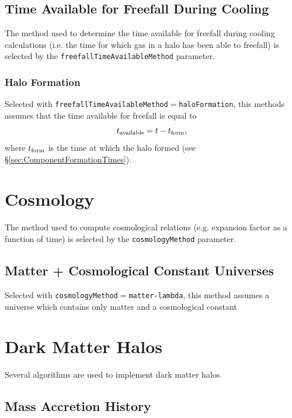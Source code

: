 \subsection{Time Available for Freefall During Cooling}\label{sec:TimeAvailableFreefall}

The method used to determine the time available for freefall during cooling calculations (i.e. the time for which gas in a halo has been able to freefall) is selected by the {\tt freefallTimeAvailableMethod} parameter.

\subsubsection{Halo Formation}

Selected with {\tt freefallTimeAvailableMethod}$=${\tt haloFormation}, this methods assumes that the time available for freefall is equal to
\begin{equation}
 t_{\rm available} = t - t_{\rm form},
\end{equation}
where $t_{\rm form}$ is the time at which the halo formed (see \S\ref{sec:ComponentFormationTimes}).

\section{Cosmology}

The method used to compute cosmological relations (e.g. expansion factor as a function of time) is selected by the {\tt cosmologyMethod} parameter.

\subsection{Matter + Cosmological Constant Universes}

Selected with {\tt cosmologyMethod}$=${\tt matter-lambda}, this method assumes a universe which contains only matter and a cosmological constant

\section{Dark Matter Halos}

Several algorithms are used to implement dark matter halos.

\subsection{Mass Accretion History}


